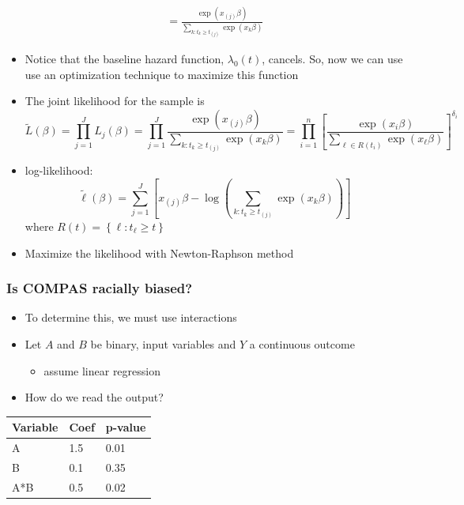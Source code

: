 \documentclass[
]{article}
\providecommand{\tightlist}{%
  \setlength{\itemsep}{0pt}\setlength{\parskip}{0pt}}
\begin{document}
\begin{itemize}
\[\begin{align*}
  = \frac{\exp(x_{(j)}\beta)}{\sum_{k: t_k\geq t_{(j)}} \exp(x_k\beta)}
  \end{align*}\]
\item
  Notice that the baseline hazard function, \(\lambda_0(t)\), cancels.
  So, now we can use use an optimization technique to maximize this
  function
\item
  The joint likelihood for the sample is
  \[\tilde L(\beta) = \prod_{j=1}^J L_j(\beta) = \prod_{j=1}^J \frac{\exp(x_{(j)}\beta)}{\sum_{k: t_k\geq t_{(j)}} \exp(x_k\beta)}
  = \prod_{i=1}^n \left[\frac{\exp(x_i\beta)}{\sum_{\ell\in R(t_i)} \exp(x_\ell\beta)}\right]^{\delta_i}\]
\item
  log-likelihood: \[
  \tilde \ell(\beta) = \sum_{j=1}^J\left[ x_{(j)}\beta - \log \left(\sum_{k: t_k\geq t_{(j)}} \exp(x_k\beta) \right)\right]
  \] where \(R(t) = \left\{\ell: t_\ell \geq t\right\}\)
\item
  Maximize the likelihood with Newton-Raphson method
\end{itemize}

\hypertarget{is-compas-racially-biased}{%
\subsubsection{Is COMPAS racially
biased?}\label{is-compas-racially-biased}}

\begin{itemize}
\item
  To determine this, we must use interactions
\item
  Let \(A\) and \(B\) be binary, input variables and \(Y\) a continuous
  outcome

  \begin{itemize}
  \tightlist
  \item
    assume linear regression
  \end{itemize}
\item
  How do we read the output?
\end{itemize}

\begin{longtable}[]{@{}lll@{}}
\toprule
Variable & Coef & p-value \\
\midrule
\endhead
A & 1.5 & 0.01 \\
B & 0.1 & 0.35 \\
A*B & 0.5 & 0.02 \\
\bottomrule
\end{longtable}
\end{document}
